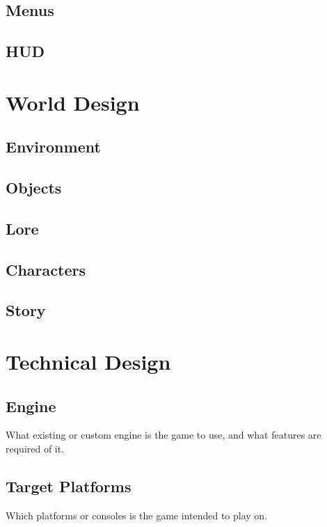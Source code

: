 \subsection{Menus}
\subsection{HUD}

\section{World Design}
\subsection{Environment}
\subsection{Objects}
\subsection{Lore}
\subsection{Characters}
\subsection{Story}

\section{Technical Design}
\subsection{Engine}
What existing or custom engine is the game to use, and what features are required of it.
\subsection{Target Platforms}
Which platforms or consoles is the game intended to play on.

